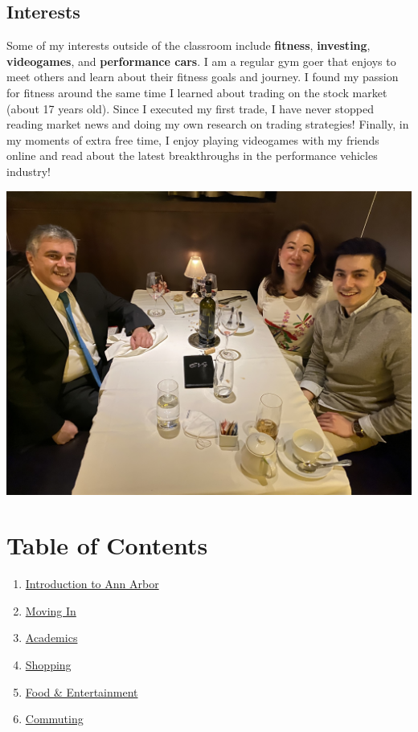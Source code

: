 \documentclass[
]{book}
\providecommand{\tightlist}{%
  \setlength{\itemsep}{0pt}\setlength{\parskip}{0pt}}
\begin{document}
\hypertarget{interests}{%
\section{Interests}\label{interests}}

Some of my interests outside of the classroom include \textbf{fitness}, \textbf{investing}, \textbf{videogames}, and \textbf{performance cars}. I am a regular gym goer that enjoys to meet others and learn about their fitness goals and journey. I found my passion for fitness around the same time I learned about trading on the stock market (about 17 years old). Since I executed my first trade, I have never stopped reading market news and doing my own research on trading strategies! Finally, in my moments of extra free time, I enjoy playing videogames with my friends online and read about the latest breakthroughs in the performance vehicles industry!

\includegraphics{About_Me_Photo.jpeg}

\hypertarget{table-of-contents}{%
\chapter*{Table of Contents}\label{table-of-contents}}

\begin{enumerate}
\def\labelenumi{\arabic{enumi}.}
\tightlist
\item
  \protect\hyperlink{introduction}{Introduction to Ann Arbor}
\item
  \protect\hyperlink{move-in}{Moving In}
\item
  \protect\hyperlink{academics}{Academics}
\item
  \protect\hyperlink{shopping}{Shopping}
\item
  \protect\hyperlink{food-entertainment}{Food \& Entertainment}
\item
  \protect\hyperlink{commuting}{Commuting}
\end{enumerate}
\end{document}
